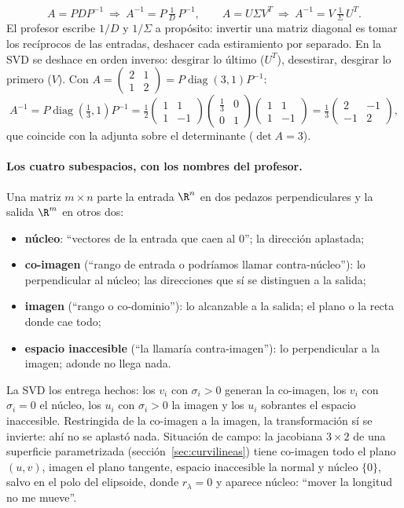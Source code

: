 \begin{resultado}
\[
  A=PDP^{-1}\ \Rightarrow\ A^{-1}=P\,\tfrac1D\,P^{-1},\qquad
  A=U\Sigma V^T\ \Rightarrow\ A^{-1}=V\,\tfrac1\Sigma\,U^T .
\]
El profesor escribe \(1/D\) y \(1/\Sigma\) a propósito: invertir una matriz diagonal es
tomar los recíprocos de las entradas, deshacer cada estiramiento por separado. En la SVD
se deshace en orden inverso: desgirar lo último (\(U^T\)), desestirar, desgirar lo primero
(\(V\)). Con \(A=\begin{pmatrix}2&1\\1&2\end{pmatrix}=P\operatorname{diag}(3,1)P^{-1}\):
\[
  A^{-1}=P\operatorname{diag}(\tfrac13,1)P^{-1}
  =\tfrac12\begin{pmatrix}1&1\\1&-1\end{pmatrix}\begin{pmatrix}\tfrac13&0\\0&1\end{pmatrix}
  \begin{pmatrix}1&1\\1&-1\end{pmatrix}
  =\tfrac13\begin{pmatrix}2&-1\\-1&2\end{pmatrix},
\]
que coincide con la adjunta sobre el determinante (\(\det A=3\)).
\end{resultado}

\paragraph{Los cuatro subespacios, con los nombres del profesor.} Una matriz \(m\times n\)
parte la entrada \(\R^n\) en dos pedazos perpendiculares y la salida \(\R^m\) en otros dos:
\begin{itemize}
  \item \textbf{núcleo}: ``vectores de la entrada que caen al \(0\)''; la dirección
  aplastada;
  \item \textbf{co-imagen} (``rango de entrada o podríamos llamar contra-núcleo''):
  lo perpendicular al núcleo; las direcciones que sí se distinguen a la salida;
  \item \textbf{imagen} (``rango o co-dominio''): lo alcanzable a la salida; el plano o la
  recta donde cae todo;
  \item \textbf{espacio inaccesible} (``la llamaría contra-imagen''): lo perpendicular a la
  imagen; adonde no llega nada.
\end{itemize}
La SVD los entrega hechos: los \(v_i\) con \(\sigma_i>0\) generan la co-imagen, los
\(v_i\) con \(\sigma_i=0\) el núcleo, los \(u_i\) con \(\sigma_i>0\) la imagen y los
\(u_i\) sobrantes el espacio inaccesible. Restringida de la co-imagen a la imagen, la
transformación sí se invierte: ahí no se aplastó nada. Situación de campo: la jacobiana
\(3\times2\) de una superficie parametrizada (sección~\ref{sec:curvilineas}) tiene
co-imagen todo el plano \((u,v)\), imagen el plano tangente, espacio inaccesible la normal
y núcleo \(\{0\}\), salvo en el polo del elipsoide, donde \(r_\lambda=0\) y aparece núcleo:
``mover la longitud no me mueve''.

